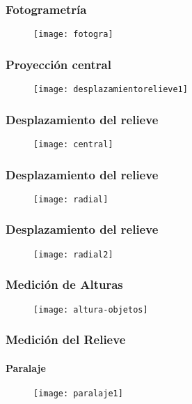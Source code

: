 \documentclass[14pt]{beamer}
\begin{document}
\begin{frame}
\frametitle{Fotogrametría} 
 \begin{figure}
    \centering
    \texttt{[image: fotogra]}
  \end{figure}
\end{frame}
\begin{frame}
\frametitle{Proyección central} 
 \begin{figure}
    \centering
    \texttt{[image: desplazamientorelieve1]}
  \end{figure}
\end{frame}
\begin{frame}
\frametitle{Desplazamiento del relieve} 
 \begin{figure}
    \centering
    \texttt{[image: central]}
  \end{figure}
\end{frame}
\begin{frame}
\frametitle{Desplazamiento del relieve} 
 \begin{figure}
    \centering
    \texttt{[image: radial]}
  \end{figure}
\end{frame}
\begin{frame}
\frametitle{Desplazamiento del relieve} 
 \begin{figure}
    \centering
    \texttt{[image: radial2]}
  \end{figure}
\end{frame}
\begin{frame}
\frametitle{Medición de Alturas} 
 \begin{figure}
    \centering
    \texttt{[image: altura-objetos]}
  \end{figure}
\end{frame}
\begin{frame}
\frametitle{Medición del Relieve}
\framesubtitle{Paralaje}
 \begin{figure}
    \centering
    \texttt{[image: paralaje1]}
  \end{figure}
\end{frame}
\end{document}
